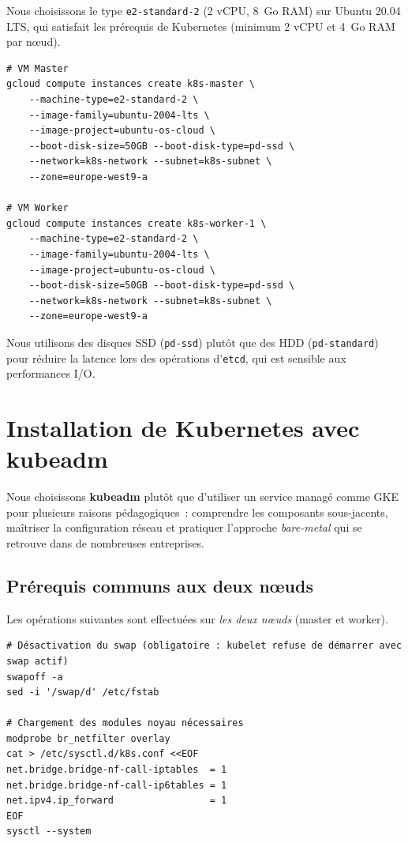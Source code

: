 \documentclass[12pt,a4paper,french]{report}
\newcommand{\cmd}[1]{\texttt{\small\color{keywordcolor}#1}}
\newcommand{\kw}[1]{\textbf{#1}}
\begin{document}
Nous choisissons le type \cmd{e2-standard-2} (2 vCPU, 8~Go RAM) sur Ubuntu 20.04 LTS, qui satisfait les prérequis de Kubernetes (minimum 2 vCPU et 4~Go RAM par nœud).

\begin{lstlisting}[style=bash, caption={Création des VMs master et worker}]
# VM Master
gcloud compute instances create k8s-master \
    --machine-type=e2-standard-2 \
    --image-family=ubuntu-2004-lts \
    --image-project=ubuntu-os-cloud \
    --boot-disk-size=50GB --boot-disk-type=pd-ssd \
    --network=k8s-network --subnet=k8s-subnet \
    --zone=europe-west9-a

# VM Worker
gcloud compute instances create k8s-worker-1 \
    --machine-type=e2-standard-2 \
    --image-family=ubuntu-2004-lts \
    --image-project=ubuntu-os-cloud \
    --boot-disk-size=50GB --boot-disk-type=pd-ssd \
    --network=k8s-network --subnet=k8s-subnet \
    --zone=europe-west9-a
\end{lstlisting}

\begin{notebox}[Choix du type de disque]
Nous utilisons des disques SSD (\cmd{pd-ssd}) plutôt que des HDD (\cmd{pd-standard}) pour réduire la latence lors des opérations d'\cmd{etcd}, qui est sensible aux performances I/O.
\end{notebox}

\section{Installation de Kubernetes avec kubeadm}

Nous choisissons \kw{kubeadm} plutôt que d'utiliser un service managé comme GKE pour plusieurs raisons pédagogiques~: comprendre les composants sous-jacents, maîtriser la configuration réseau et pratiquer l'approche \emph{bare-metal} qui se retrouve dans de nombreuses entreprises.

\subsection{Prérequis communs aux deux nœuds}

Les opérations suivantes sont effectuées sur \emph{les deux nœuds} (master et worker).

\begin{lstlisting}[style=bash, caption={Configuration préalable commune aux deux nœuds}]
# Désactivation du swap (obligatoire : kubelet refuse de démarrer avec swap actif)
swapoff -a
sed -i '/swap/d' /etc/fstab

# Chargement des modules noyau nécessaires
modprobe br_netfilter overlay
cat > /etc/sysctl.d/k8s.conf <<EOF
net.bridge.bridge-nf-call-iptables  = 1
net.bridge.bridge-nf-call-ip6tables = 1
net.ipv4.ip_forward                 = 1
EOF
sysctl --system
\end{lstlisting}
\end{document}
